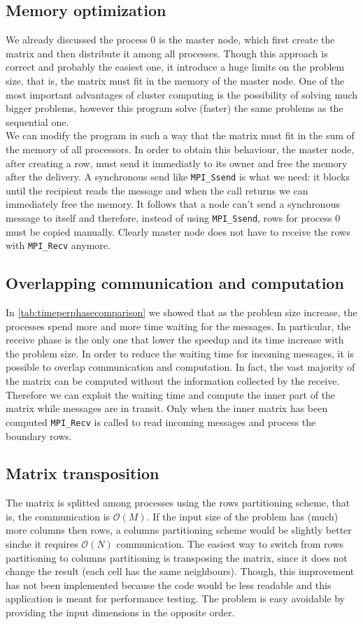\documentclass{article}
\begin{document}
\subsection{Memory optimization}
We already discussed the process 0 is the master node, which first create the matrix and then distribute it among all processes. Though this approach is correct and probably the easiest one, it introduce a huge limits on the problem size, that is, the matrix must fit in the memory of the master node. One of the most important advantages of cluster computing is the possibility of solving much bigger problems, however this program solve (faster) the same problems as the sequential one. \\
We can modify the program in such a way that the matrix must fit in the sum of the memory of all processors. In order to obtain this behaviour, the master node, after creating a row, must send it immediatly to its owner and free the memory after the delivery. A synchronous send like \texttt{MPI\_Ssend} is what we need: it blocks until the recipient reads the message and when the call returns we can immediately free the memory. It follows that a node can't send a synchronous message to itself and therefore, instead of using \texttt{MPI\_Ssend}, rows for process 0 must be copied manually. Clearly master node does not have to receive the rows with \texttt{MPI\_Recv} anymore.


\subsection{Overlapping communication and computation} \label{sec:overlappingcommcomp}
In \autoref{tab:timeperphasecomparison} we showed that as the problem size increase, the processes spend more and more time waiting for the messages. In particular, the receive phase is the only one that lower the speedup and its time increase with the problem size. In order to reduce the waiting time for incoming messages, it is possible to overlap communication and computation. In fact, the vast majority of the matrix can be computed without the information collected by the receive. Therefore we can exploit the waiting time and compute the inner part of the matrix while messages are in transit. Only when the inner matrix has been computed \texttt{MPI\_Recv} is called to read incoming messages and process the boundary rows.


\subsection{Matrix transposition}
The matrix is splitted among processes using the rows partitioning scheme, that is, the communication is $\mathcal{O}(M)$. If the input size of the problem has (much) more columns then rows, a columns partitioning scheme would be slightly better sinche it requires $\mathcal{O}(N)$ communication. The easiest way to switch from rows partitioning to columns partitioning is transposing the matrix, since it does not change the result (each cell has the same neighbours). Though, this improvement has not been implemented because the code would be less readable and this application is meant for performance testing. The problem is easy avoidable by providing the input dimensions in the opposite order.
\end{document}
